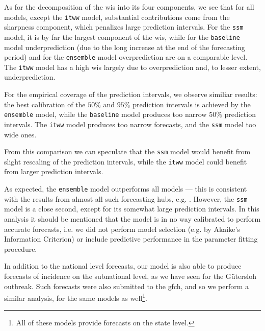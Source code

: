 As for the decomposition of the \gls{wis} into its four components, we see that for all models, except the \texttt{itww} model, substantial contributions come from the sharpness component, which penalizes large prediction intervals. For the \texttt{ssm} model, it is by far the largest component of the \gls{wis}, while for the \texttt{baseline} model underprediction (due to the long increase at the end of the forecasting period) and for the \texttt{ensemble} model overprediction are on a comparable level. 
The \texttt{itww} model has a high \gls{wis} largely due to overprediction and, to lesser extent, underprediction. 

For the empirical coverage of the prediction intervals, we observe similiar results: the best calibration of the $50\%$ and $95\%$ prediction intervals is achieved by the \texttt{ensemble} model, while the \texttt{baseline} model produces too narrow $50\%$ prediction intervals. The \texttt{itww} model produces too narrow forecasts, and the \texttt{ssm} model too wide ones. 

From this comparison we can speculate that the \texttt{ssm} model would benefit from slight rescaling of the prediction intervals, while the \texttt{itww} model could benefit from larger prediction intervals. 

As expected, the \texttt{ensemble} model outperforms all models --- this is consistent with the results from almost all such forecasting hubs, e.g. \citep{Bracher2021Comparison,Bracher2021Preregistered,Bracher2022National,Wolffram2023Collaborative,Sherratt2022Predictive,Ray2020Ensemble}. However, the \texttt{ssm} model is a close second, except for its somewhat large prediction intervals. In this analysis it should be mentioned that the model is in no way calibrated to perform accurate forecasts, i.e. we did not perform model selection (e.g. by Akaike's Information Criterion) or include predictive performance in the parameter fitting procedure.

In addition to the national level forecasts, our model is also able to produce forecasts of incidence on the subnational level, as we have seen for the Gütersloh outbreak. Such forecasts were also submitted to the \gls{gfch}, and so we perform a similar analysis, for the same models as well\footnote{All of these models provide forecasts on the state level.}.

